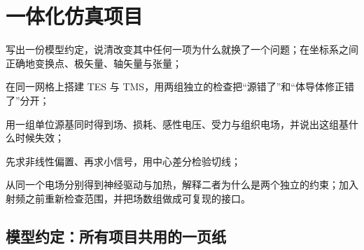 \chapter{一体化仿真项目}\label{ch:projects}

\providecommand{\labcard}[4]{\par\noindent\begingroup\small\renewcommand{\arraystretch}{1.28}%
\arrayrulecolor{accent!45}%
\begin{tabularx}{\linewidth}{@{}>{\leavevmode\sffamily\bfseries\color{accent}\raggedright\arraybackslash}p{.1\linewidth}Y@{}}
\toprule
\ZE{目标}{Goal} & #1\\
\ZE{用到}{Builds on} & #2\\
\ZE{输入}{Inputs} & #3\\
\ZE{产出}{Outputs} & #4\\
\bottomrule
\end{tabularx}\arrayrulecolor{black}\endgroup\par}

\begin{chapterguide}
\begin{guidegoals}
\item 写出一份模型约定，说清改变其中任何一项为什么就换了一个问题；在坐标系之间正确地变换点、极矢量、轴矢量与张量；
\item 在同一网格上搭建 TES 与 TMS，用两组独立的检查把“源错了”和“体导体修正错了”分开；
\item 用一组单位源基同时得到场、损耗、感性电压、受力与组织电场，并说出这组基什么时候失效；
\item 先求非线性偏置、再求小信号，用中心差分检验切线；
\item 从同一个电场分别得到神经驱动与加热，解释二者为什么是两个独立的约束；加入射频之前重新检查范围，并把场数组做成可复现的接口。
\end{guidegoals}
\end{chapterguide}

\section{模型约定：所有项目共用的一页纸}\label{sec:projects-contract}

